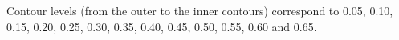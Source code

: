 Contour levels (from the outer to the inner contours) correspond to 0.05, 0.10, 0.15, 0.20, 0.25, 0.30, 0.35, 0.40, 0.45, 0.50, 0.55, 0.60 and 0.65.
